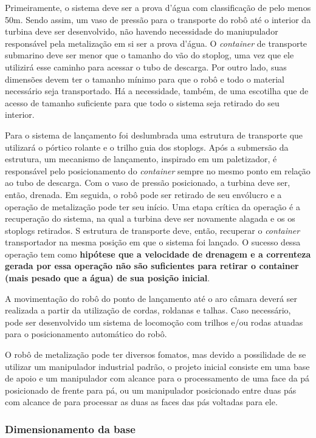 Primeiramente, o sistema deve ser a prova d'água com classificação de pelo
menos 50m.
Sendo assim, um vaso de pressão para o transporte do robô até o interior da turbina deve ser
desenvolvido, não havendo necessidade do maniupulador responsável pela
metalização em si ser a prova d'água. O \textit{container} de transporte
submarino deve ser menor que o tamanho do vão do stoplog, uma vez que ele
utilizirá esse caminho para acessar o tubo de descarga. Por outro lado, suas
dimensões devem ter o tamanho mínimo para que o robô e todo o material
necessário seja transportado. Há a necessidade, também, de uma escotilha que
 de acesso de tamanho suficiente para que todo o sistema seja retirado do seu
 interior.

Para o sistema de lançamento foi deslumbrada uma estrutura de transporte que
utilizará o pórtico rolante e o trilho guia dos stoplogs. Após a submersão da
estrutura, um mecanismo de lançamento, inspirado em um paletizador, é
responsável pelo posicionamento do \textit{container} sempre no mesmo ponto em
relação ao tubo de descarga. Com o vaso de pressão posicionado, a turbina deve
ser, então, drenada. Em seguida, o robô pode ser retirado de seu
envólucro e a operação de metalização pode ter seu início. Uma etapa crítica da
operação é a recuperação do sistema, na qual a turbina deve ser novamente
alagada e os os stoplogs retirados. S estrutura de transporte deve, então,
recuperar o \textit{container} transportador na mesma posição em que o sistema
foi lançado. O sucesso dessa operação tem como \textbf{hipótese que a velocidade
de drenagem e a correnteza gerada por essa operação não são suficientes para
retirar o container (mais pesado que a água) de sua posição inicial}. 

A movimentação do robô do ponto de lançamento até o aro câmara deverá ser
realizada a partir da utilização de cordas, roldanas e talhas. Caso necessário,
pode ser desenvolvido um sistema de locomoção com trilhos e/ou rodas atuadas
para o posicionamento automático do robô.

O robô de metalização pode ter diversos fomatos, mas devido a possilidade de se
utilizar um manipulador industrial padrão, o projeto inicial consiste em uma
base de apoio e um manipulador com alcance para o processamento de uma face da
pá posicionado de frente para pá, ou um manipulador posicionado entre duas pás com
alcance de para processar as duas as faces das pás voltadas para ele.

\subsubsection{Dimensionamento da base}

